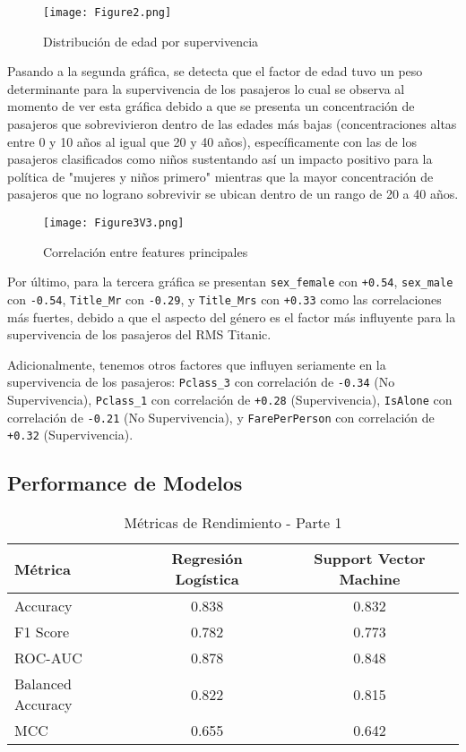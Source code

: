 \documentclass[conference]{IEEEtran}
\begin{document}
\begin{figure}[h!]
    \centering
    \texttt{[image: Figure2.png]}
    \caption{Distribución de edad por supervivencia}
    \label{fig:etiqueta_de_la_imagen}
\end{figure}

Pasando a la segunda gráfica, se detecta que el factor de edad tuvo un peso determinante para la supervivencia de los pasajeros lo cual se observa al momento de ver esta gráfica debido a que se presenta un concentración de pasajeros que sobrevivieron dentro de las edades más bajas (concentraciones altas entre 0 y 10 años al igual que 20 y 40 años), específicamente con las de los pasajeros clasificados como niños sustentando así un impacto positivo para la política de "mujeres y niños primero" mientras que la mayor concentración de pasajeros que no lograno sobrevivir se ubican dentro de un rango de 20 a 40 años.

\begin{figure}[h!]
    \centering
    \texttt{[image: Figure3V3.png]}
    \caption{Correlación entre features principales}
    \label{fig:etiqueta_de_la_imagen}
\end{figure}


Por último, para la tercera gráfica se presentan 
\texttt{sex\_female} con \texttt{+0.54}, 
\texttt{sex\_male} con \texttt{-0.54}, 
\texttt{Title\_Mr} con \texttt{-0.29}, 
y \texttt{Title\_Mrs} con \texttt{+0.33} como las correlaciones más fuertes,
debido a que el aspecto del género es el factor más influyente para la supervivencia 
de los pasajeros del RMS Titanic. 

Adicionalmente, tenemos otros factores que influyen seriamente en la supervivencia 
de los pasajeros: 
\texttt{Pclass\_3} con correlación de \texttt{-0.34} (No Supervivencia), 
\texttt{Pclass\_1} con correlación de \texttt{+0.28} (Supervivencia), 
\texttt{IsAlone} con correlación de \texttt{-0.21} (No Supervivencia),
y \texttt{FarePerPerson} con correlación de \texttt{+0.32} (Supervivencia).


\subsection{Performance de Modelos}

\begin{table}[h!]
    \centering
    \caption{Métricas de Rendimiento - Parte 1}
    \begin{tabular}{lcc}
        \toprule
        \textbf{Métrica} & \textbf{Regresión Logística} & \textbf{Support Vector Machine} \\
        \midrule
        Accuracy & 0.838 & 0.832 \\
        F1 Score & 0.782 & 0.773 \\
        ROC-AUC & 0.878 & 0.848 \\
        Balanced Accuracy & 0.822 & 0.815 \\
        MCC & 0.655 & 0.642 \\
        \bottomrule
    \end{tabular}
\end{table}
\end{document}
